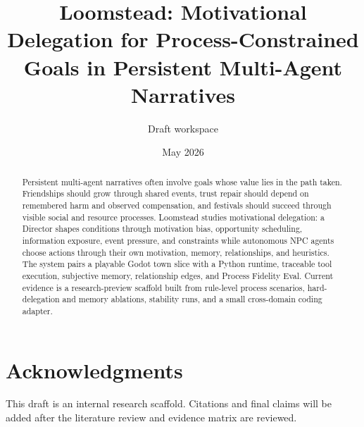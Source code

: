 \documentclass[11pt]{article}
\title{Loomstead: Motivational Delegation for Process-Constrained Goals in Persistent Multi-Agent Narratives}
\author{Draft workspace}
\date{May 2026}
\begin{document}
\maketitle

\begin{abstract}
Persistent multi-agent narratives often involve goals whose value lies in the path taken. Friendships should grow through shared events, trust repair should depend on remembered harm and observed compensation, and festivals should succeed through visible social and resource processes. Loomstead studies motivational delegation: a Director shapes conditions through motivation bias, opportunity scheduling, information exposure, event pressure, and constraints while autonomous NPC agents choose actions through their own motivation, memory, relationships, and heuristics. The system pairs a playable Godot town slice with a Python runtime, traceable tool execution, subjective memory, relationship edges, and Process Fidelity Eval. Current evidence is a research-preview scaffold built from rule-level process scenarios, hard-delegation and memory ablations, stability runs, and a small cross-domain coding adapter.
\end{abstract}










\section*{Acknowledgments}
This draft is an internal research scaffold. Citations and final claims will be added after the literature review and evidence matrix are reviewed.



\end{document}
